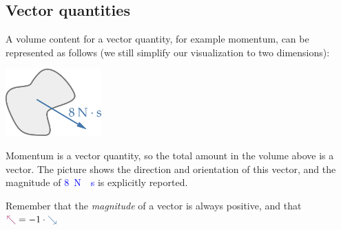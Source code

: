 \documentclass[a4paper,12pt,%
onecolumn,oneside,titlepage,%
british%
]{memoir}
\renewcommand*{\|}[1][]{\nonscript\:#1\vert\nonscript\:\mathopen{}}
\begin{document}
\subsection{Vector quantities}\label{sec:volintegral_vector}

A volume content for a vector quantity, for example momentum, can be represented as follows (we still simplify our visualization to two dimensions):
\begin{center}
  \includegraphics[height=7em]{images/volumeintegral_8Ns.pdf}
\end{center}
Momentum is a vector quantity, so the total amount in the volume above is a vector. The picture shows the direction and orientation of this vector, and the magnitude of \textcolor{blue}{\qty{8}{N\cdot s}}
is explicitly reported.
\begin{warning}
  Remember that the \emph{magnitude} of a vector is always positive, and that\quad $\mathord{\mathcolor{purple}{\nwarrow}} = -1\cdot\mathord{\mathcolor{blue}{\searrow}}$
\end{warning}
\end{document}
